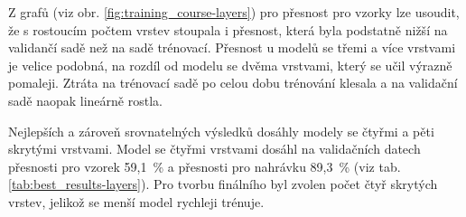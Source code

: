 \documentclass[FM,BP]{tulthesis}
\begin{document}
Z grafů (viz obr. \mbox{\ref{fig:training_course-layers}})  pro přesnost pro vzorky lze usoudit, že s rostoucím počtem vrstev stoupala i přesnost, která byla podstatně nižší na validančí sadě než na sadě trénovací. Přesnost u modelů se třemi a více vrstvami je velice podobná, na rozdíl od modelu se dvěma vrstvami, který se učil výrazně pomaleji. Ztráta na trénovací sadě po celou dobu trénování klesala a na validační sadě naopak lineárně rostla. 

Nejlepších a zároveň srovnatelných výsledků dosáhly modely se čtyřmi a pěti skrytými vrstvami. Model se čtyřmi vrstvami dosáhl na validačních datech přesnosti pro vzorek \mbox{59,1 \%} a přesnosti pro nahrávku \mbox{89,3 \%} (viz tab. \mbox{\ref{tab:best_results-layers}}). Pro tvorbu finálního byl zvolen počet čtyř skrytých vrstev, jelikož se menší model rychleji trénuje.

\begin{table}[htb]
\centering
\caption{Přehled nejlepších výsledků pro různé počty skrytých vrstev}
\label{tab:best_results-layers}
\end{table}
\FloatBarrier
\end{document}
